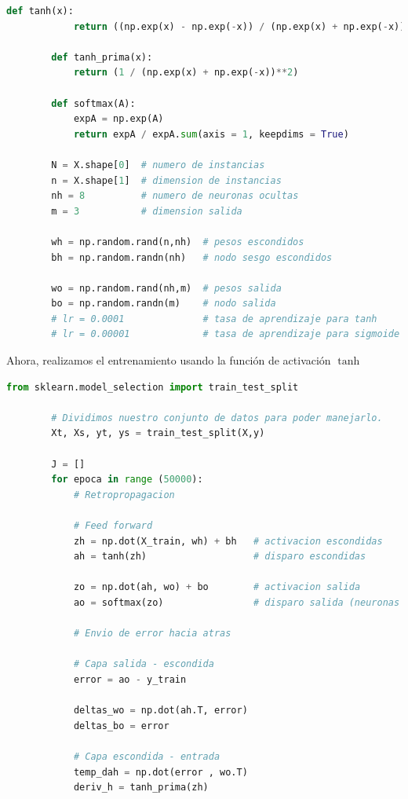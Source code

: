 \documentclass[letterpaper,11pt]{article}
\begin{document}
\begin{enumerate}
\begin{enumerate}
\begin{lstlisting}[language=Python]
        def tanh(x):
            return ((np.exp(x) - np.exp(-x)) / (np.exp(x) + np.exp(-x)))

        def tanh_prima(x):
            return (1 / (np.exp(x) + np.exp(-x))**2)

        def softmax(A):
            expA = np.exp(A)
            return expA / expA.sum(axis = 1, keepdims = True)

        N = X.shape[0]  # numero de instancias
        n = X.shape[1]  # dimension de instancias
        nh = 8          # numero de neuronas ocultas
        m = 3           # dimension salida

        wh = np.random.rand(n,nh)  # pesos escondidos
        bh = np.random.randn(nh)   # nodo sesgo escondidos

        wo = np.random.rand(nh,m)  # pesos salida
        bo = np.random.randn(m)    # nodo salida
        # lr = 0.0001              # tasa de aprendizaje para tanh
        # lr = 0.00001             # tasa de aprendizaje para sigmoide
        \end{lstlisting}

        \newpage
        Ahora, realizamos el entrenamiento usando la función de activación 
        $\tanh$
        \begin{lstlisting}[language=Python]
        from sklearn.model_selection import train_test_split

        # Dividimos nuestro conjunto de datos para poder manejarlo.
        Xt, Xs, yt, ys = train_test_split(X,y)

        J = []
        for epoca in range (50000):
            # Retropropagacion
            
            # Feed forward
            zh = np.dot(X_train, wh) + bh   # activacion escondidas
            ah = tanh(zh)                   # disparo escondidas

            zo = np.dot(ah, wo) + bo        # activacion salida 
            ao = softmax(zo)                # disparo salida (neuronas salida)
            
            # Envio de error hacia atras
            
            # Capa salida - escondida  
            error = ao - y_train

            deltas_wo = np.dot(ah.T, error)
            deltas_bo = error

            # Capa escondida - entrada
            temp_dah = np.dot(error , wo.T)
            deriv_h = tanh_prima(zh)


\end{lstlisting}
\end{enumerate}
\end{enumerate}
\end{document}

